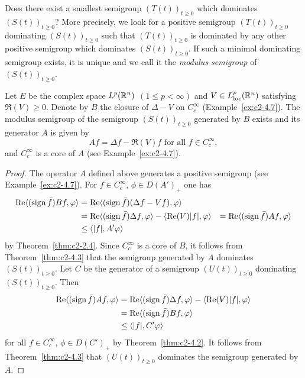 Does there exist a smallest semigroup $(T(t))_{t \geq 0}$ which dominates $(S(t))_{t \geq 0}$?
More precisely, we look for a positive semigroup $(T(t))_{t \geq 0}$ dominating $(S(t))_{t \geq 0}$ such that $(T(t))_{t \geq 0}$ is dominated
by any other positive semigroup which dominates $(S(t))_{t \geq 0}$.
If such a minimal dominating semigroup exists, it is unique and we call it the
\emph{modulus semigroup} of\/ $(S(t))_{t \geq 0}$.
\begin{example}
\label{ex:c2-4.15}
\quad Let $E$ be the complex space $L^{p}(\mathbb{R}^{n})$ $(1 \leq p < \infty)$ and $V \in L^{p}_{\text{loc}}(\mathbb{R}^{n})$ satisfying $\Re(V) \geq 0$.
Denote by $B$ the closure of\/ $\Delta - V$ on $C^{\infty}_{c}$
(\cf Example~\ref{ex:c2-4.7}).
The modulus semigroup of the semigroup $(S(t))_{t \geq 0}$ generated by $B$ exists and its generator $A$ is given by 
\[
Af = \Delta f - \Re(V)f \text{ for all } f \in C^{\infty}_{c} ,
\]
and $C^{\infty}_{c}$ is a core of\/ $A$ (see Example~\ref{ex:c2-4.7}).
\end{example}
\begin{proof}
The operator $A$ defined above generates a positive semigroup (see Example~\ref{ex:c2-4.7}).
For $f \in C^{\infty}_{c}$, $\phi \in D(A')_{+}$ one has
\begin{align*}
\Re\langle(\sign  \bar{f})Bf,\phi\rangle &= \Re\langle(\sign  \bar{f})(\Delta f - Vf),\phi\rangle \\
&=\Re\langle(\sign  \bar{f})\Delta f,\phi\rangle - \langle\Re(V)|f|,\phi\rangle &= \Re\langle(\sign  \bar{f})Af,\phi\rangle \\
&\leq \langle|f|,A'\phi\rangle 
\end{align*}
by Theorem~\ref{thm:c2-2.4}.
Since $C^{\infty}_{c}$ is a core of\/ $B$, it follows from Theorem~\ref{thm:c2-4.3}   that the semigroup generated by $A$ dominates $(S(t))_{t \geq 0}$.
Let $C$ be the generator of a semigroup $(U(t))_{t \geq 0}$ dominating $(S(t))_{t \geq 0}$.
Then
\begin{align*}
\Re\langle(\sign  \bar{f})Af,\phi\rangle &= \Re\langle(\sign  \bar{f})\Delta f,\phi\rangle - \langle\Re(V)|f|,\phi\rangle \\
&= \Re\langle(\sign  \bar{f})Bf,\phi\rangle\\
&\leq \langle|f|,C'\phi\rangle 
\end{align*}
for all  $f \in C^{\infty}_{c}$, $\phi \in D(C')_{+}$  by Theorem~\ref{thm:c2-4.2}. 
It follows from Theorem~\ref{thm:c2-4.3}   that $(U(t))_{t \geq 0}$ dominates the semigroup generated by $A$.
\end{proof}
